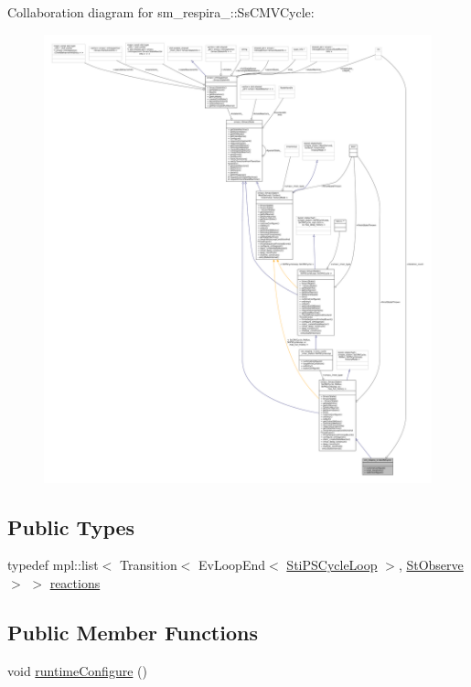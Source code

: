 Collaboration diagram for sm\+\_\+respira\+\_\+:\+:Ss\+C\+M\+V\+Cycle\+:
\nopagebreak
\begin{figure}[H]
\begin{center}
\leavevmode
\includegraphics[width=350pt]{structsm__respira__1_1_1SsCMVCycle__coll__graph}
\end{center}
\end{figure}
\subsection*{Public Types}
\begin{DoxyCompactItemize}
\item 
typedef mpl\+::list$<$ Transition$<$ Ev\+Loop\+End$<$ \hyperlink{structsm__respira__1_1_1cmv__cycle__inner__states_1_1StiPSCycleLoop}{Sti\+P\+S\+Cycle\+Loop} $>$, \hyperlink{structsm__respira__1_1_1StObserve}{St\+Observe} $>$ $>$ \hyperlink{structsm__respira__1_1_1SsCMVCycle_a87e9c2d749f95092b86958b08a8b9ae4}{reactions}
\end{DoxyCompactItemize}
\subsection*{Public Member Functions}
\begin{DoxyCompactItemize}
\item 
void \hyperlink{structsm__respira__1_1_1SsCMVCycle_a8cf930dea0543149d8571982afa81533}{runtime\+Configure} ()
\end{DoxyCompactItemize}
